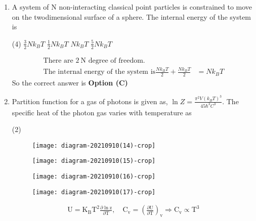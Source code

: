 \begin{enumerate}
	\item A system of $\mathrm{N}$ non-interacting classical point particles is constrained to move on the twodimensional surface of a sphere. The internal energy of the system is
	{}
	\begin{tasks}(4)
		\task[\textbf{A.}] $\frac{3}{2} N k_{B} T$
		\task[\textbf{B.}] $\frac{1}{2} N k_{B} T$
		\task[\textbf{C.}] $N k_{B} T$
		\task[\textbf{D.}] $\frac{5}{2} N k_{B} T$
	\end{tasks}
	\begin{answer}
		\begin{align*}
		\text{There are $2 \mathrm{~N}$ degree of freedom.}\\
		\text{The internal energy of the system is}\frac{N k_{B} T}{2}+\frac{N k_{B} T}{2}&=N k_{B} T
		\end{align*}
		So the correct answer is \textbf{Option (C)}
	\end{answer}
	\item Partition function for a gas of photons is given as, $\ln Z=\frac{\pi^{2} V\left(k_{B} T\right)^{3}}{45 \hbar^{3} C^{3}}$. The specific heat of the photon gas varies with temperature as
	{}
	\begin{tasks}(2)
		\task[\textbf{A.}] \begin{figure}[H]
			\centering
			\texttt{[image: diagram-20210910(14)-crop]}
		\end{figure}
		\task[\textbf{B.}] \begin{figure}[H]
			\centering
			\texttt{[image: diagram-20210910(15)-crop]}
		\end{figure}
		\task[\textbf{C.}] \begin{figure}[H]
			\centering
			\texttt{[image: diagram-20210910(16)-crop]}
		\end{figure}
		\task[\textbf{D.}] \begin{figure}[H]
			\centering
			\texttt{[image: diagram-20210910(17)-crop]}
		\end{figure}
	\end{tasks}
	\begin{answer}
		\begin{align*}
		\mathrm{U}=\mathrm{K}_{\mathrm{B}} \mathrm{T}^{2} \frac{\partial \ln \mathrm{z}}{\partial \mathrm{T}}, \quad \mathrm{C}_{\mathrm{v}}=\left(\frac{\partial \mathrm{U}}{\partial \mathrm{T}}\right)_{\mathrm{v}} \Rightarrow \mathrm{C}_{\mathrm{v}} \propto \mathrm{T}^{3}

\end{align*}
\end{answer}
\end{enumerate}
